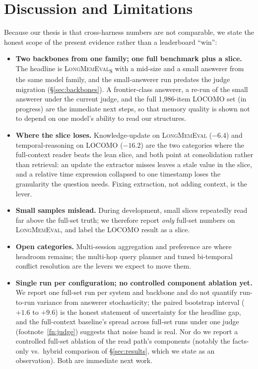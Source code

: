 \documentclass{article}
\begin{document}
\section{Discussion and Limitations}
\label{sec:limitations}

Because our thesis is that cross-harness numbers are not comparable, we state the honest scope of the
present evidence rather than a leaderboard ``win'':

\begin{itemize}
  \item \textbf{Two backbones from one family; one full benchmark plus a slice.} The headline is
  \textsc{LongMemEval}\textsubscript{S} with a mid-size and a small answerer from the same model family, and
  the small-answerer run predates the judge migration (\S\ref{sec:backbones}). A frontier-class answerer, a
  re-run of the small answerer under the current judge, and the full 1,986-item LOCOMO set (in progress)
  are the immediate next steps, so that memory quality is shown not to depend on one model's ability to
  read our structures.
  \item \textbf{Where the slice loses.} Knowledge-update on \textsc{LongMemEval} ($-6.4$) and
  temporal-reasoning on LOCOMO ($-16.2$) are the two categories where the full-context reader beats the
  lean slice, and both point at consolidation rather than retrieval: an update the extractor misses leaves a
  stale value in the slice, and a relative time expression collapsed to one timestamp loses the granularity
  the question needs. Fixing extraction, not adding context, is the lever.
  \item \textbf{Small samples mislead.} During development, small slices repeatedly read far above the
  full-set truth; we therefore report \emph{only} full-set numbers on \textsc{LongMemEval}, and label the
  LOCOMO result as a slice.
  \item \textbf{Open categories.} Multi-session aggregation and preference are where headroom remains; the
  multi-hop query planner and tuned bi-temporal conflict resolution are the levers we expect to move them.
  \item \textbf{Single run per configuration; no controlled component ablation yet.} We report one full-set
  run per system and backbone and do not quantify run-to-run variance from answerer stochasticity; the
  paired bootstrap interval ($+1.6$ to $+9.6$) is the honest statement of uncertainty for the headline gap,
  and the full-context baseline's spread across full-set runs under one judge (footnote~\ref{fn:judge})
  suggests that noise band is real. Nor do we report a controlled full-set ablation of the read path's
  components (notably the facts-only vs.\ hybrid comparison of \S\ref{sec:results}, which we state as an
  observation). Both are immediate next work.
\end{itemize}
\end{document}
